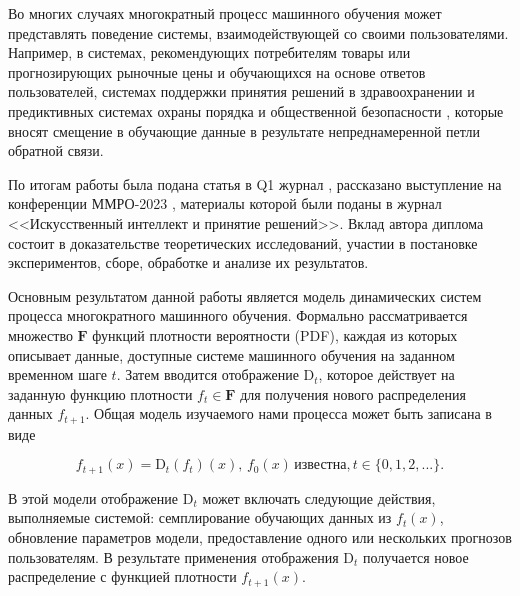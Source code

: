 Во многих случаях многократный процесс машинного обучения может представлять поведение системы, взаимодействующей со своими пользователями. Например, в системах, рекомендующих потребителям товары или прогнозирующих рыночные цены \cite{khritankov2021existence, sinha2016deconvolving} и обучающихся на основе ответов пользователей, системах поддержки принятия решений в здравоохранении \cite{adam2020hidden} и предиктивных системах охраны порядка и общественной безопасности \cite{ensign2018runaway}, которые вносят смещение в обучающие данные в результате непреднамеренной петли обратной связи.

По итогам работы была подана статья в Q1 журнал \cite{veprikov2024mathematical}, рассказано выступление на конференции ММРО-2023 \cite{veprikov2023matematicheskaya}, материалы которой были поданы в журнал <<Искусственный интеллект и принятие решений>>. Вклад автора диплома состоит в доказательстве теоретических исследований, участии в постановке экспериментов, сборе, обработке и анализе их результатов.

Основным результатом данной работы является модель динамических систем \cite{galor2007discrete} процесса многократного машинного обучения. Формально рассматривается множество $\textbf{F}$ функций плотности вероятности (PDF), каждая из которых описывает данные, доступные системе машинного обучения на заданном временном шаге $t$. Затем вводится отображение $\text{D}_t$, которое действует на заданную функцию плотности $f_t \in \textbf{F}$ для получения нового распределения данных $f_{t+1}$. Общая модель изучаемого нами процесса может быть записана в виде

\begin{equation*} 
        f_{t+1}(x) = \text{D}_t(f_t)(x),\, f_0(x)\, \text{известна}, t \in \{0, 1, 2,...\}.
\end{equation*}

В этой модели отображение $\text{D}_t$ может включать следующие действия, выполняемые системой: семплирование обучающих данных из $f_t(x)$, обновление параметров модели, предоставление одного или нескольких прогнозов пользователям. В результате применения отображения $\text{D}_t$ получается новое распределение с функцией плотности $f_{t+1}(x)$.


